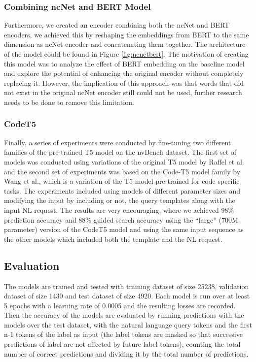 \documentclass[
	a4paper, %
	10pt, %
	unnumberedsections, %
	twoside, %
]{t0003}
\begin{document}
\subsubsection{Combining ncNet and BERT Model} Furthermore, we created an encoder combining both the ncNet and BERT encoders, we achieved this by reshaping the embeddings from BERT to the same dimension as ncNet encoder and concatenating them together. The architecture of the model could be found in Figure \ref{fig:ncnetbert}. The motivation of creating this model was to analyze the effect of BERT embedding on the baseline model and explore the potential of enhancing the original encoder without completely replacing it. However, the implication of this approach was that words that did not exist in the original ncNet encoder still could not be used, further research needs to be done to remove this limitation.

\subsubsection{CodeT5} Finally, a series of experiments were conducted by fine-tuning two different families of the pre-trained T5 model on the nvBench dataset. The first set of models was conducted using variations of the original T5 model \cite{Raffel:2020qr} by Raffel et al. and the second set of experiments was based on the Code-T5 model family \cite{Yue:2021qr2} by Wang et al., which is a variation of the T5 model pre-trained for code specific tasks. The experiments included using models of different parameter sizes and modifying the input by including or not, the query templates along with the input NL request. The results are very encouraging, where we achieved 98\% prediction accuracy and 88\% guided search accuracy using the “large” (700M parameter) version of the CodeT5 model and using the same input sequence as the other models which included both the template and the NL request.

\subsection{Evaluation}

The models are trained and tested with training dataset of size 25238, validation dataset of size 1430 and test dataset of size 4920. Each model is run over at least 5 epochs with a learning rate of 0.0005 and the resulting losses are recorded.
Then the accuracy of the models are evaluated by running predictions with the models over the test dataset, with the natural language query tokens and the first n-1 tokens of the label as input (the label tokens are masked so that successive predictions of label are not affected by future label tokens), counting the total number of correct predictions and dividing it by the total number of predictions.
\end{document}
